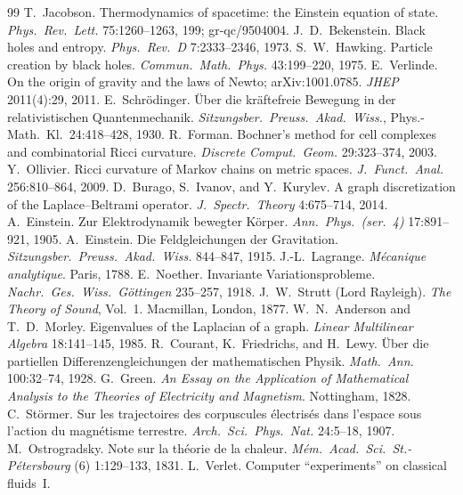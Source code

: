 \documentclass[10pt,twocolumn]{article}
\theoremstyle{definition}
\begin{document}
\begin{thebibliography}{99}\small
{} T.~Jacobson. Thermodynamics of spacetime: the Einstein equation of
state. \emph{Phys.\ Rev.\ Lett.} 75:1260--1263, 199; gr-qc/9504004.
 J.~D.~Bekenstein. Black holes and entropy.
\emph{Phys.\ Rev.\ D} 7:2333--2346, 1973.
 S.~W.~Hawking. Particle creation by black holes.
\emph{Commun.\ Math.\ Phys.} 43:199--220, 1975.
 E.~Verlinde. On the origin of gravity and the laws of Newto; arXiv:1001.0785.
\emph{JHEP} 2011(4):29, 2011.
 E.~Schr\"odinger. \"Uber die kr\"aftefreie Bewegung in der
relativistischen Quantenmechanik. \emph{Sitzungsber.\ Preuss.\ Akad.\ Wiss.},
Phys.-Math.\ Kl.\ 24:418--428, 1930.
 R.~Forman. Bochner's method for cell complexes and combinatorial
Ricci curvature. \emph{Discrete Comput.\ Geom.} 29:323--374, 2003.
 Y.~Ollivier. Ricci curvature of Markov chains on metric spaces.
\emph{J.\ Funct.\ Anal.} 256:810--864, 2009.
 D.~Burago, S.~Ivanov, and Y.~Kurylev. A graph discretization of the
Laplace--Beltrami operator. \emph{J.\ Spectr.\ Theory} 4:675--714, 2014.
 A.~Einstein. Zur Elektrodynamik bewegter K\"orper.
\emph{Ann.\ Phys.\ (ser.~4)} 17:891--921, 1905.
 A.~Einstein. Die Feldgleichungen der Gravitation.
\emph{Sitzungsber.\ Preuss.\ Akad.\ Wiss.} 844--847, 1915.
 J.-L.~Lagrange. \emph{M\'ecanique analytique}. Paris, 1788.
 E.~Noether. Invariante Variationsprobleme.
\emph{Nachr.\ Ges.\ Wiss.\ G\"ottingen} 235--257, 1918.
 J.~W.~Strutt (Lord Rayleigh). \emph{The Theory of Sound}, Vol.~1.
Macmillan, London, 1877.
 W.~N.~Anderson and T.~D.~Morley. Eigenvalues of the
Laplacian of a graph. \emph{Linear Multilinear Algebra} 18:141--145, 1985.
 R.~Courant, K.~Friedrichs, and H.~Lewy. \"Uber die partiellen
Differenzengleichungen der mathematischen Physik. \emph{Math.\ Ann.}
100:32--74, 1928.
 G.~Green. \emph{An Essay on the Application of Mathematical
Analysis to the Theories of Electricity and Magnetism}. Nottingham, 1828.
 C.~St\"ormer. Sur les trajectoires des corpuscules
\'electris\'es dans l'espace sous l'action du magn\'etisme terrestre.
\emph{Arch.\ Sci.\ Phys.\ Nat.} 24:5--18, 1907.
 M.~Ostrogradsky. Note sur la th\'eorie de la chaleur.
\emph{M\'em.\ Acad.\ Sci.\ St.-P\'etersbourg} (6) 1:129--133, 1831.
 L.~Verlet. Computer ``experiments'' on classical fluids~I.

\end{thebibliography}
\end{document}
